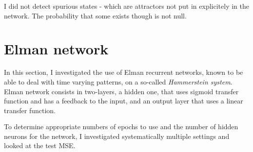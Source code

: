 \documentclass[11pt, a4paper]{article}
\begin{document}
I did not detect spurious states - which are attractors not put in
explicitely in the network. The probability that some exists though is
not null.

\section{Elman network}

In this section, I investigated the use of Elman recurrent networks,
known to be able to deal with time varying patterns, on a so-called
\emph{Hammerstein system}. Elman network consists in two-layers, a
hidden one, that uses sigmoid transfer function and has a feedback to
the input, and an output layer that uses a linear transfer function.

To determine appropriate numbers of epochs to use and the number of
hidden neurons for the network, I investigated systematically multiple
settings and looked at the test MSE.

 

\end{document}
